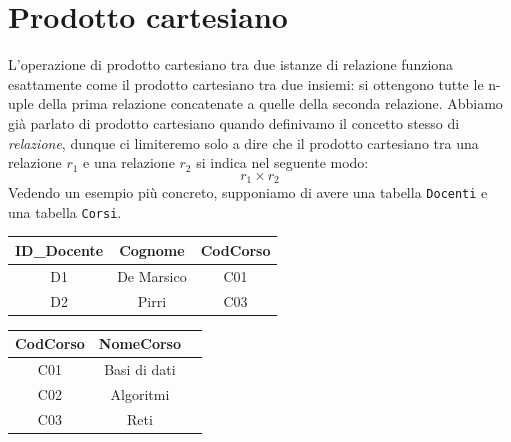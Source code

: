 \documentclass[12pt]{report}
\begin{document}
	\section{Prodotto cartesiano}
	L'operazione di prodotto cartesiano tra due istanze di relazione funziona esattamente come il prodotto cartesiano tra due insiemi: si ottengono tutte le n-uple della prima relazione concatenate a quelle della seconda relazione. Abbiamo già parlato di prodotto cartesiano quando definivamo il concetto stesso di \textit{relazione}, dunque ci limiteremo solo a dire che il prodotto cartesiano tra una relazione $r_1$ e una relazione $r_2$ si indica nel seguente modo:
	\[
		r_1 \times r_2
	\]
	Vedendo un esempio più concreto, supponiamo di avere una tabella \texttt{Docenti} e una tabella \texttt{Corsi}.\\
	\begin{minipage}[t]{0.48\textwidth}
		\vspace{0.5em}
		\centering
		\renewcommand{\arraystretch}{1.3}
		\begin{tabular}{|c|c|c|}
			\hline
			\rowcolor{BrickRed!60!white}
			ID\_Docente & Cognome & CodCorso \\
			\hline
			D1 & De Marsico & C01\\\hline
			D2 & Pirri & C03\\\hline
		\end{tabular}
	\end{minipage}\hfill
	\begin{minipage}[t]{0.48\textwidth}
		\vspace{0.5em}
		\centering
		\renewcommand{\arraystretch}{1.3}
		\begin{tabular}{|c|c|c|}
			\hline
			\rowcolor{BrickRed!60!white}
			CodCorso & NomeCorso\\
			\hline
			C01 & Basi di dati\\\hline
			C02 & Algoritmi \\\hline
			C03 & Reti\\\hline
		\end{tabular}
	\end{minipage}
	
\end{document}
